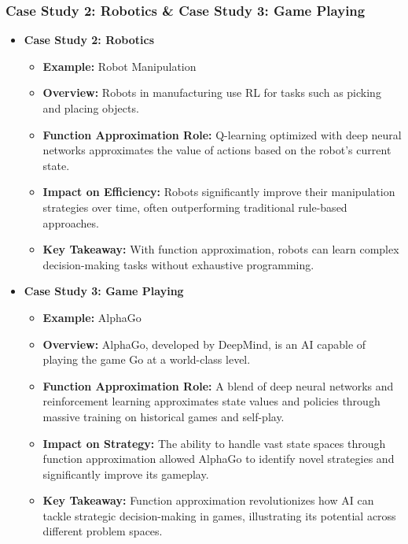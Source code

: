 \documentclass[aspectratio=169]{beamer}
\begin{document}
\begin{frame}[fragile]
    \frametitle{Case Study 2: Robotics \& Case Study 3: Game Playing}
    \begin{itemize}
        \item \textbf{Case Study 2: Robotics}
        \begin{itemize}
            \item \textbf{Example:} Robot Manipulation
            \item \textbf{Overview:} Robots in manufacturing use RL for tasks such as picking and placing objects.
            \item \textbf{Function Approximation Role:} Q-learning optimized with deep neural networks approximates the value of actions based on the robot's current state.
            \item \textbf{Impact on Efficiency:} Robots significantly improve their manipulation strategies over time, often outperforming traditional rule-based approaches.
            \item \textbf{Key Takeaway:} With function approximation, robots can learn complex decision-making tasks without exhaustive programming.
        \end{itemize}

        \item \textbf{Case Study 3: Game Playing}
        \begin{itemize}
            \item \textbf{Example:} AlphaGo
            \item \textbf{Overview:} AlphaGo, developed by DeepMind, is an AI capable of playing the game Go at a world-class level.
            \item \textbf{Function Approximation Role:} A blend of deep neural networks and reinforcement learning approximates state values and policies through massive training on historical games and self-play.
            \item \textbf{Impact on Strategy:} The ability to handle vast state spaces through function approximation allowed AlphaGo to identify novel strategies and significantly improve its gameplay.
            \item \textbf{Key Takeaway:} Function approximation revolutionizes how AI can tackle strategic decision-making in games, illustrating its potential across different problem spaces.
        \end{itemize}
    \end{itemize}
\end{frame}
\end{document}
